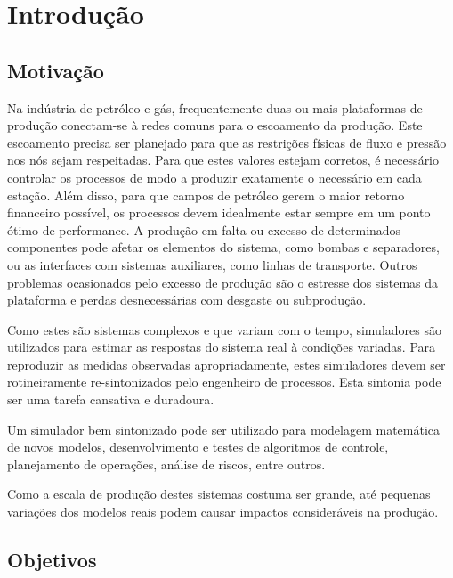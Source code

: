 

\chapter{Introdução} \label{chap:1}



\section{Motivação}
Na indústria de petróleo e gás, frequentemente duas ou mais plataformas de produção conectam-se à redes comuns para o escoamento da produção. 
%
Este escoamento precisa ser planejado para que as restrições físicas de fluxo e pressão nos nós sejam respeitadas.
%
Para que estes valores estejam corretos, é necessário controlar os processos de modo a produzir exatamente o necessário em cada estação.
%
Além disso, para que campos de petróleo gerem o maior retorno financeiro possível, os processos devem idealmente estar sempre em um ponto ótimo de performance.
%
A produção em falta ou excesso de determinados componentes pode afetar os elementos do sistema, como bombas e separadores, ou as interfaces com sistemas auxiliares, como linhas de transporte.
% 
Outros problemas ocasionados pelo excesso de produção são o estresse dos sistemas da plataforma e perdas desnecessárias com desgaste ou subprodução.

Como estes são sistemas complexos e que variam com o tempo, simuladores são utilizados para estimar as respostas do sistema real à condições variadas. 
%
Para reproduzir as medidas observadas apropriadamente, estes simuladores devem ser rotineiramente re-sintonizados pelo engenheiro de processos. 
%
Esta sintonia pode ser uma tarefa cansativa e duradoura.
  
Um simulador bem sintonizado pode ser utilizado para modelagem matemática de novos modelos, desenvolvimento e testes de algoritmos de controle, planejamento de operações, análise de riscos, entre outros.	

Como a escala de produção destes sistemas costuma ser grande, até pequenas variações dos modelos reais podem causar impactos consideráveis na produção.


\section{Objetivos}

